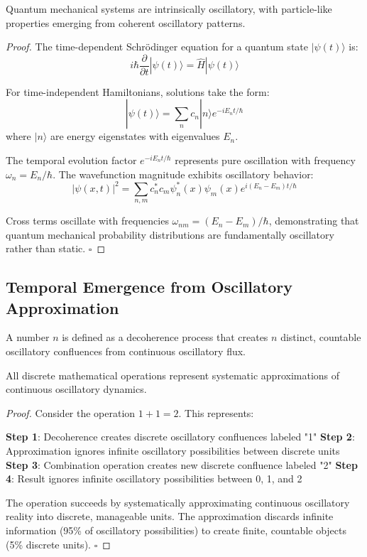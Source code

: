 \documentclass[11pt,a4paper]{article}
\begin{document}
\begin{theorem}
Quantum mechanical systems are intrinsically oscillatory, with particle-like properties emerging from coherent oscillatory patterns.
\end{theorem}

\begin{proof}
The time-dependent Schrödinger equation for a quantum state $|\psi(t)\rangle$ is:
$$i\hbar \frac{\partial}{\partial t}|\psi(t)\rangle = \hat{H}|\psi(t)\rangle$$

For time-independent Hamiltonians, solutions take the form:
$$|\psi(t)\rangle = \sum_n c_n |n\rangle e^{-iE_n t/\hbar}$$
where $|n\rangle$ are energy eigenstates with eigenvalues $E_n$.

The temporal evolution factor $e^{-iE_n t/\hbar}$ represents pure oscillation with frequency $\omega_n = E_n/\hbar$. The wavefunction magnitude exhibits oscillatory behavior:
$$|\psi(x,t)|^2 = \sum_{n,m} c_n^* c_m \psi_n^*(x) \psi_m(x) e^{i(E_n - E_m)t/\hbar}$$

Cross terms oscillate with frequencies $\omega_{nm} = (E_n - E_m)/\hbar$, demonstrating that quantum mechanical probability distributions are fundamentally oscillatory rather than static. $\square$
\end{proof}

\subsection{Temporal Emergence from Oscillatory Approximation}

\begin{definition}
A number $n$ is defined as a decoherence process that creates $n$ distinct, countable oscillatory confluences from continuous oscillatory flux.
\end{definition}

\begin{theorem}
All discrete mathematical operations represent systematic approximations of continuous oscillatory dynamics.
\end{theorem}

\begin{proof}
Consider the operation $1 + 1 = 2$. This represents:

\textbf{Step 1}: Decoherence creates discrete oscillatory confluences labeled "1"
\textbf{Step 2}: Approximation ignores infinite oscillatory possibilities between discrete units
\textbf{Step 3}: Combination operation creates new discrete confluence labeled "2"
\textbf{Step 4}: Result ignores infinite oscillatory possibilities between 0, 1, and 2

The operation succeeds by systematically approximating continuous oscillatory reality into discrete, manageable units. The approximation discards infinite information (95\% of oscillatory possibilities) to create finite, countable objects (5\% discrete units). $\square$
\end{proof}
\end{document}
